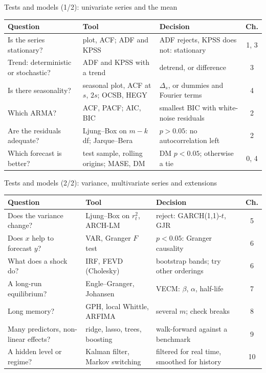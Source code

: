 \begin{frame}{Tests and models (1/2): univariate series and the mean}
\itemsize{\small}
\begin{center}
\footnotesize
\begin{tabular}{>{\raggedright\arraybackslash}p{3.5cm}>{\raggedright\arraybackslash}p{3.5cm}>{\raggedright\arraybackslash}p{3.6cm}c}
\toprule
\textbf{Question} & \textbf{Tool} & \textbf{Decision} & \textbf{Ch.} \\
\midrule
Is the series stationary? & plot, ACF; ADF and KPSS & ADF rejects, KPSS does not: stationary & 1, 3 \\
Trend: deterministic or stochastic? & ADF and KPSS with a trend & detrend, or difference & 3 \\
Is there seasonality? & seasonal plot, ACF at $s$, $2s$; OCSB, HEGY & $\Delta_s$, or dummies and Fourier terms & 4 \\
Which ARMA? & ACF, PACF; AIC, BIC & smallest BIC with white-noise residuals & 2 \\
Are the residuals adequate? & Ljung--Box on $m - k$ df; Jarque--Bera & $p > 0.05$: no autocorrelation left & 2 \\
Which forecast is better? & test sample, rolling origins; MASE, DM & DM $p < 0.05$; otherwise a tie & 0, 4 \\
\bottomrule
\end{tabular}
\end{center}
\end{frame}

\begin{frame}{Tests and models (2/2): variance, multivariate series and extensions}
\itemsize{\small}
\begin{center}
\footnotesize
\begin{tabular}{>{\raggedright\arraybackslash}p{3.5cm}>{\raggedright\arraybackslash}p{3.5cm}>{\raggedright\arraybackslash}p{3.6cm}c}
\toprule
\textbf{Question} & \textbf{Tool} & \textbf{Decision} & \textbf{Ch.} \\
\midrule
Does the variance change? & Ljung--Box on $r_t^2$, ARCH-LM & reject: GARCH(1,1)-$t$, GJR & 5 \\
Does $x$ help to forecast $y$? & VAR, Granger $F$ test & $p < 0.05$: Granger causality & 6 \\
What does a shock do? & IRF, FEVD (Cholesky) & bootstrap bands; try other orderings & 6 \\
A long-run equilibrium? & Engle--Granger, Johansen & VECM: $\beta$, $\alpha$, half-life & 7 \\
Long memory? & GPH, local Whittle, ARFIMA & several $m$; check breaks & 8 \\
Many predictors, non-linear effects? & ridge, lasso, trees, boosting & walk-forward against a benchmark & 9 \\
A hidden level or regime? & Kalman filter, Markov switching & filtered for real time, smoothed for history & 10 \\
\bottomrule
\end{tabular}
\end{center}
\end{frame}

